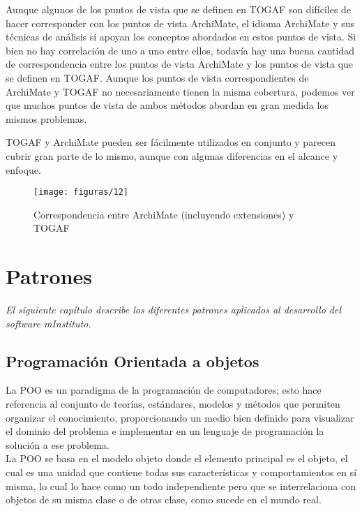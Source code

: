    Aunque algunos de los puntos de vista que se definen en TOGAF son difíciles de hacer corresponder con los puntos de vista ArchiMate, el idioma ArchiMate y sus técnicas de análisis sí apoyan los conceptos abordados en estos puntos de vista. Si bien no hay correlación de uno a uno entre ellos, todavía hay una buena cantidad de correspondencia entre los puntos de vista ArchiMate y los puntos de vista que se definen en TOGAF. Aunque los puntos de vista correspondientes de ArchiMate y TOGAF no necesariamente tienen la misma cobertura, podemos ver que muchos puntos de vista de ambos métodos abordan en gran medida los mismos problemas.
   
   TOGAF y ArchiMate pueden ser fácilmente utilizados en conjunto y parecen cubrir gran parte de lo mismo, aunque con algunas diferencias en el alcance y enfoque.
   
     \begin{figure}[H]
     	\centering
     	\texttt{[image: figuras/12]}
     	\captionsetup{width=.95\textwidth}
     	\caption{Correspondencia entre ArchiMate (incluyendo extensiones) y TOGAF  \cite{ref9}}
     	\label{figura12}
     \end{figure}

\chapter{Patrones}
\label{chap:patrones}
\textit{El siguiente capítulo describe los diferentes patrones aplicados al desarrollo del software mInstituto.}
\vfill
\minitoc
\newpage

\section{Programación Orientada a objetos}
La POO es un paradigma de la programación de computadores; esto hace referencia al conjunto de teorías, estándares, modelos y métodos que permiten organizar el conocimiento, proporcionando un medio bien definido para visualizar el dominio del problema e implementar en un lenguaje de programación la solución a ese problema. \\

La POO se basa en el modelo objeto donde el elemento principal es el objeto, el cual es una unidad que contiene todas sus características y comportamientos en sí misma, lo cual lo hace como un todo independiente pero que se interrelaciona con objetos de su misma clase o de otras clase, como sucede en el mundo real. \cite{ref11}\\

